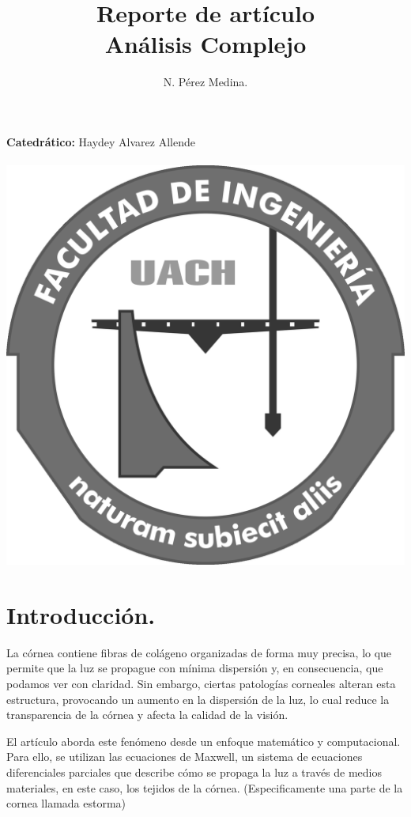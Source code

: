 \documentclass[10pt,a4paper]{article}
\title{Reporte de artículo\\Análisis Complejo}
\author{N. Pérez Medina.}
\begin{document}
\maketitle
\begin{center}
	\textbf{Catedrático:} Haydey Alvarez Allende \\
	\\
	\includegraphics[scale=0.05]{fing-escudo-bw.png} 
\end{center}
\newpage
\section{Introducción.}

La córnea contiene fibras de colágeno organizadas de forma muy precisa, lo que permite que la luz se propague con mínima dispersión y, en consecuencia, que podamos ver con claridad. Sin embargo, ciertas patologías corneales alteran esta estructura, provocando un aumento en la dispersión de la luz, lo cual reduce la transparencia de la córnea y afecta la calidad de la visión.

El artículo aborda este fenómeno desde un enfoque matemático y computacional. Para ello, se utilizan las ecuaciones de Maxwell, un sistema de ecuaciones diferenciales parciales que describe cómo se propaga la luz a través de medios materiales, en este caso, los tejidos de la córnea. (Especificamente una parte de la cornea llamada estorma)
\end{document}
